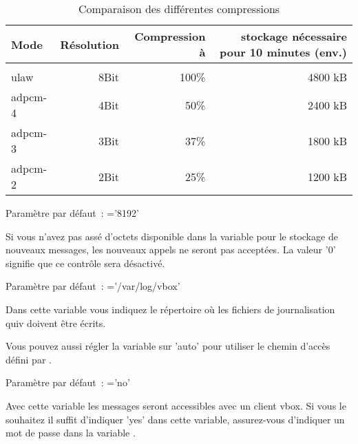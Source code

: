 \begin{description}
    \begin{table}[htbp]
      \begin{tabular}{lrrr}
        Mode     & Résolution & Compression à & stockage nécessaire pour 10 minutes (env.) \\
        \hline \\
        ulaw     & 8Bit             & 100\%           & 4800 kB       \\
        adpcm-4  & 4Bit             &  50\%           & 2400 kB       \\
        adpcm-3  & 3Bit             &  37\%           & 1800 kB       \\
        adpcm-2  & 2Bit             &  25\%           & 1200 kB       \\
      \end{tabular}
      \caption{Comparaison des différentes compressions}
    \end{table}


    Paramètre par défaut~: ='8192'

    Si vous n'avez pas assé d'octets disponible dans la variable 
	pour le stockage de nouveaux messages, les nouveaux appels ne seront pas acceptées.
	La valeur '0' signifie que ce contrôle sera désactivé.


    Paramètre par défaut~: ='/var/log/vbox'

    Dans cette variable vous indiquez le répertoire où les fichiers de journalisation quiv
	doivent être écrits.

    Vous pouvez aussi régler la variable sur 'auto' pour utiliser le chemin d'accès défini par
	.


    Paramètre par défaut~: ='no'

    Avec cette variable les messages seront accessibles avec un client vbox. Si vous le souhaitez
	il suffit d'indiquer 'yes' dans cette variable, assurez-vous d'indiquer un mot de passe dans
	la variable .




\end{description}
